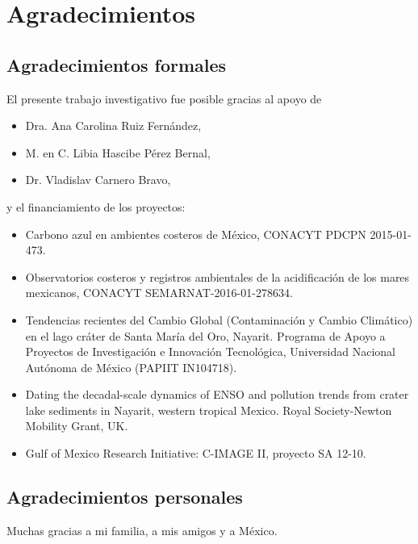 {}
{}
\chapter*{Agradecimientos}
\section*{Agradecimientos formales}
El presente trabajo investigativo fue posible gracias al apoyo de 
\begin{itemize}
\item Dra. Ana Carolina Ruiz Fernández,
\item M. en C. Libia Hascibe Pérez Bernal,
\item Dr. Vladislav Carnero Bravo,
\end{itemize}
y el financiamiento de los proyectos:
\begin{itemize}
\item Carbono azul en ambientes costeros de México, CONACYT PDCPN 2015-01-473.
\item Observatorios costeros y registros ambientales de la acidificación de los mares mexicanos, CONACYT SEMARNAT-2016-01-278634.
\item Tendencias recientes del Cambio Global (Contaminación y Cambio Climático) en el lago cráter de Santa María del Oro, Nayarit. Programa de Apoyo a Proyectos de Investigación e Innovación Tecnológica, Universidad Nacional Autónoma de México (PAPIIT IN104718).
\item Dating the decadal-scale dynamics of ENSO and pollution trends from crater lake sediments in Nayarit, western tropical Mexico. Royal Society-Newton Mobility Grant, UK.
\item Gulf of Mexico Research Initiative: C-IMAGE II, proyecto SA 12-10.
\end{itemize}
\section*{Agradecimientos personales}
Muchas gracias a mi familia, a mis amigos y a México.